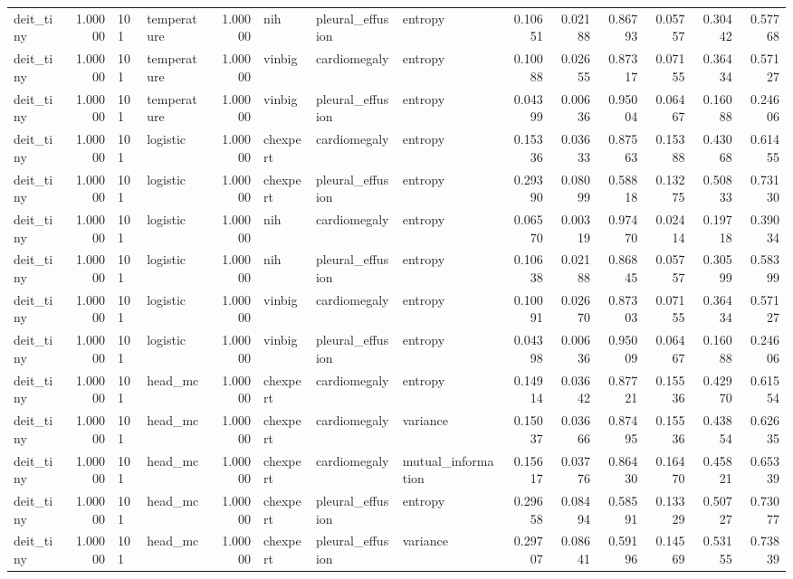 \begin{tabular}{lrllrlllrrrrrr}
deit\_tiny & 1.00000 & 101 & temperature & 1.00000 & nih & pleural\_effusion & entropy & 0.10651 & 0.02188 & 0.86793 & 0.05757 & 0.30442 & 0.57768 \\
deit\_tiny & 1.00000 & 101 & temperature & 1.00000 & vinbig & cardiomegaly & entropy & 0.10088 & 0.02655 & 0.87317 & 0.07155 & 0.36434 & 0.57127 \\
deit\_tiny & 1.00000 & 101 & temperature & 1.00000 & vinbig & pleural\_effusion & entropy & 0.04399 & 0.00636 & 0.95004 & 0.06467 & 0.16088 & 0.24606 \\
deit\_tiny & 1.00000 & 101 & logistic & 1.00000 & chexpert & cardiomegaly & entropy & 0.15336 & 0.03633 & 0.87563 & 0.15388 & 0.43068 & 0.61455 \\
deit\_tiny & 1.00000 & 101 & logistic & 1.00000 & chexpert & pleural\_effusion & entropy & 0.29390 & 0.08099 & 0.58818 & 0.13275 & 0.50833 & 0.73130 \\
deit\_tiny & 1.00000 & 101 & logistic & 1.00000 & nih & cardiomegaly & entropy & 0.06570 & 0.00319 & 0.97470 & 0.02414 & 0.19718 & 0.39034 \\
deit\_tiny & 1.00000 & 101 & logistic & 1.00000 & nih & pleural\_effusion & entropy & 0.10638 & 0.02188 & 0.86845 & 0.05757 & 0.30599 & 0.58399 \\
deit\_tiny & 1.00000 & 101 & logistic & 1.00000 & vinbig & cardiomegaly & entropy & 0.10091 & 0.02670 & 0.87303 & 0.07155 & 0.36434 & 0.57127 \\
deit\_tiny & 1.00000 & 101 & logistic & 1.00000 & vinbig & pleural\_effusion & entropy & 0.04398 & 0.00636 & 0.95009 & 0.06467 & 0.16088 & 0.24606 \\
deit\_tiny & 1.00000 & 101 & head\_mc & 1.00000 & chexpert & cardiomegaly & entropy & 0.14914 & 0.03642 & 0.87721 & 0.15536 & 0.42970 & 0.61554 \\
deit\_tiny & 1.00000 & 101 & head\_mc & 1.00000 & chexpert & cardiomegaly & variance & 0.15037 & 0.03666 & 0.87495 & 0.15536 & 0.43854 & 0.62635 \\
deit\_tiny & 1.00000 & 101 & head\_mc & 1.00000 & chexpert & cardiomegaly & mutual\_information & 0.15617 & 0.03776 & 0.86430 & 0.16470 & 0.45821 & 0.65339 \\
deit\_tiny & 1.00000 & 101 & head\_mc & 1.00000 & chexpert & pleural\_effusion & entropy & 0.29658 & 0.08494 & 0.58591 & 0.13329 & 0.50727 & 0.73077 \\
deit\_tiny & 1.00000 & 101 & head\_mc & 1.00000 & chexpert & pleural\_effusion & variance & 0.29707 & 0.08641 & 0.59196 & 0.14569 & 0.53155 & 0.73839 \\

\end{tabular}

